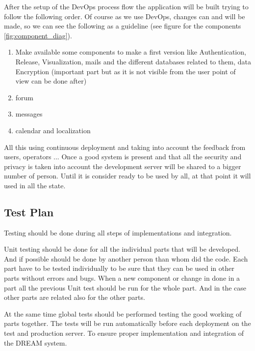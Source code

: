 After the setup of the DevOps process flow the application will be built trying to follow the following order. Of course as we use DevOps, changes can and will be made, so we can see the following as a guideline (see figure for the components \ref{fig:component_diag}).

\begin{enumerate}
	\item Make available some components to make a first version like Authentication, Release, Visualization, mails and the different databases related to them, data Encryption (important part but as it is not visible from the user point of view can be done after)
	\item forum
	\item messages
	\item calendar and localization
\end{enumerate}
All this using continuous deployment and taking into account the feedback from users, operators ...
Once a good system is present and that all the security and privacy is taken into account the development server will be shared to a bigger number of person. Until it is consider ready to be used by all, at that point it will used in all the state.
\subsection{Test Plan}
Testing should be done during all steps of implementations and integration.

Unit testing should be done for all the individual parts that will be developed. And if possible should be done by another person than whom did the code. Each part have to be tested individually to be sure that they can be used in other parts without errors and bugs. When a new component or change in done in a part all the previous Unit test should be run for the whole part. And in the case other parts are related also for the other parts.

At the same time global tests should be performed testing the good working of parts together. The tests will be run automatically before each deployment on the test and production server. To ensure proper implementation and integration of the DREAM system.